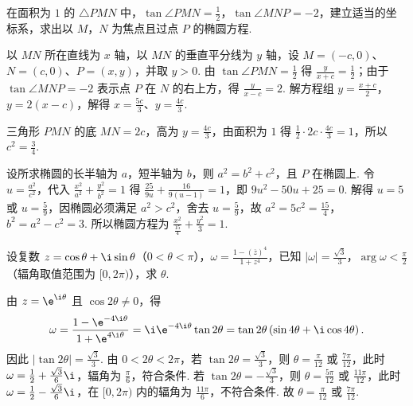 \begin{problem}
在面积为 \(1\) 的 \(\triangle PMN\) 中，\(\tan \angle PMN = \frac{1}{2}\)，\(\tan \angle MNP = -2\)，建立适当的坐标系，求出以 \(M\)，\(N\) 为焦点且过点 \(P\) 的椭圆方程.
\end{problem}

\begin{solution}
以 \(MN\) 所在直线为 \(x\) 轴，以 \(MN\) 的垂直平分线为 \(y\) 轴，设 \(M=(-c,0)\)、\(N=(c,0)\)、\(P=(x,y)\)，并取 \(y>0\). 由 \(\tan\angle PMN=\frac{1}{2}\) 得 \(\frac{y}{x+c}=\frac{1}{2}\)；由于 \(\tan\angle MNP=-2\) 表示点 \(P\) 在 \(N\) 的右上方，得 \(\frac{y}{x-c}=2\). 解方程组
\(\displaystyle y=\frac{x+c}{2}\)，\(\displaystyle y=2(x-c)\)，解得 \(x=\frac{5c}{3}\)、\(y=\frac{4c}{3}\).

三角形 \(PMN\) 的底 \(MN=2c\)，高为 \(y=\frac{4c}{3}\)，由面积为 \(1\) 得 \(\displaystyle\frac{1}{2}\cdot2c\cdot\frac{4c}{3}=1\)，所以 \(c^2=\frac{3}{4}\).

设所求椭圆的长半轴为 \(a\)，短半轴为 \(b\)，则 \(a^2=b^2+c^2\)，且 \(P\) 在椭圆上. 令 \(u=\frac{a^2}{c^2}\)，代入 \(\displaystyle\frac{x^2}{a^2}+\frac{y^2}{b^2}=1\) 得
\(\displaystyle\frac{25}{9u}+\frac{16}{9(u-1)}=1\)，即 \(9u^2-50u+25=0\). 解得 \(u=5\) 或 \(u=\frac{5}{9}\)，因椭圆必须满足 \(a^2>c^2\)，舍去 \(u=\frac{5}{9}\)，故 \(a^2=5c^2=\frac{15}{4}\)，\(b^2=a^2-c^2=3\). 所以椭圆方程为
\(\displaystyle\frac{x^2}{\frac{15}{4}}+\frac{y^2}{3}=1\).
\end{solution}

\begin{problem}
设复数 \(z = \cos \theta + \i\sin \theta\)（\(0 < \theta < \pi\)），\(\omega = \frac{1 - \left( \overline{z} \right)^4}{1 + z^4}\)，已知 \(|\omega| = \frac{\sqrt{3}}{3}\)，\(\arg \omega < \frac{\pi}{2}\)（辐角取值范围为 \([0,2\pi)\)），求 \(\theta\).
\end{problem}

\begin{solution}
由 \(z=\e^{\i\theta}\) 且 \(\cos2\theta\ne0\)，得
\[
\omega=\frac{1-\e^{-4\i\theta}}{1+\e^{4\i\theta}}
=\i\e^{-4\i\theta}\tan2\theta
=\tan2\theta\left(\sin4\theta+\i\cos4\theta\right).
\]
因此 \(\lvert\tan2\theta\rvert=\frac{\sqrt3}{3}\). 由 \(0<2\theta<2\pi\)，若
\(\tan2\theta=\frac{\sqrt3}{3}\)，则 \(\theta=\frac{\pi}{12}\) 或 \(\frac{7\pi}{12}\)，此时
\(\omega=\frac12+\frac{\sqrt3}{6}\i\)，辐角为 \(\frac\pi6\)，符合条件.
若 \(\tan2\theta=-\frac{\sqrt3}{3}\)，则 \(\theta=\frac{5\pi}{12}\) 或 \(\frac{11\pi}{12}\)，此时
\(\omega=\frac12-\frac{\sqrt3}{6}\i\)，在 \([0,2\pi)\) 内的辐角为 \(\frac{11\pi}{6}\)，不符合条件.
故 \(\theta=\frac{\pi}{12}\) 或 \(\frac{7\pi}{12}\).
\end{solution}
